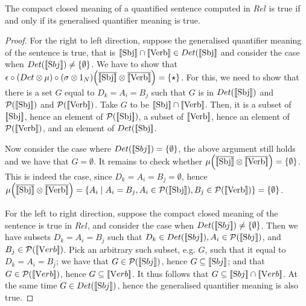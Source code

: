 \begin{proposition}
The  compact closed meaning of a quantified sentence computed in $Rel$ is true if and only if  its generalised quantifier meaning is true.
\end{proposition}

\begin{proof}
For the right to left direction,  suppose  the generalised quantifier meaning of the sentence is true, that is $[\![ \text{Sbj} ]\!] \cap [\![ \text{Verb} ]\!] \in Det([\![ \text{Sbj} ]\!]$ and consider the case when  $Det([\![ \text Sbj ]\!]) \neq \{\emptyset\}$. We have to show that $\epsilon \circ (Det \otimes \mu) \circ (\sigma \otimes 1_N) \Big(\overline{[\![ \text{Sbj} ]\!]} \otimes \overline{[\![ \text{Verb} ]\!]} \Big) = \{\star\}$.  For this, we need to show that there is a set $G$ equal to $D_k= A_i = B_j$ such that $G$ is in $Det([\![ \text{Sbj} ]\!])$ and $ {\cal P} ([\![ \text{Sbj} ]\!])$ and  ${\cal P} ([\![ \text{Verb} ]\!])$.  Take $G$ to be $[\![ \text{Sbj} ]\!] \cap [\![ \text{Verb} ]\!]$.  Then, it is a subset of   $[\![ \text{Sbj} ]\!]$, hence an element of  $ {\cal P} ([\![ \text{Sbj} ]\!])$, a subset of  $ [\![ \text{Verb} ]\!]$, hence an element of $ {\cal P} ([\![ \text{Verb} ]\!])$, and an element of $Det([\![ \text{Sbj} ]\!]$. 

Now consider  the case where   $Det([\![ \text Sbj ]\!]) = \{\emptyset\}$, the above argument still holds and we have that $G = \emptyset$.  It remains to check whether $\mu\Big(\overline{[\![ \text{Sbj} ]\!]} \otimes \overline{[\![ \text{Verb} ]\!]} \Big) = \{\emptyset\}$. This is indeed the case,   since $D_k = A_i = B_j = \emptyset$, hence   $\mu\Big(\overline{\semantics{\text{Sbj}}} \otimes \overline{\semantics{\text{Verb}}} \Big) = \{A_i \mid A_i = B_j, A_i \in {\cal P} (\semantics{\text{Sbj}}), B_j \in  {\cal P}(\semantics{\text{Verb}})\} = 
\{\emptyset\}$. 

For the left to right direction, suppose the compact closed meaning of the sentence is true in $Rel$, and consider  the case when $Det([\![ \text Sbj ]\!]) \neq \{\emptyset\}$. Then  we have  subsets $D_k = A_i = B_j$ such that $D_k \in Det([\![ \text Sbj ]\!]), A_i \in {\cal P}([\![ \text Sbj ]\!])$, and $B_j \in {\cal P}([\![ \text Verb ]\!])$.  Pick an arbitrary such subset, e.g.  $G$, such that it   equal to  $D_k = A_i = B_j$; we have that $G \in   {\cal P}([\![ \text Sbj ]\!])$, hence $G \subseteq [\![ \text Sbj ]\!]$; and that $G \in  {\cal P}([\![ \text Verb ]\!])$, hence $G \subseteq [\![ \text Verb ]\!]$. It thus follows that $G \subseteq [\![ \text Sbj ]\!]  \cap [\![ \text Verb ]\!]$. At the same time $G \in Det([\![ \text Sbj ]\!])$, hence the generalised quantifier meaning is also true.  


\end{proof}

